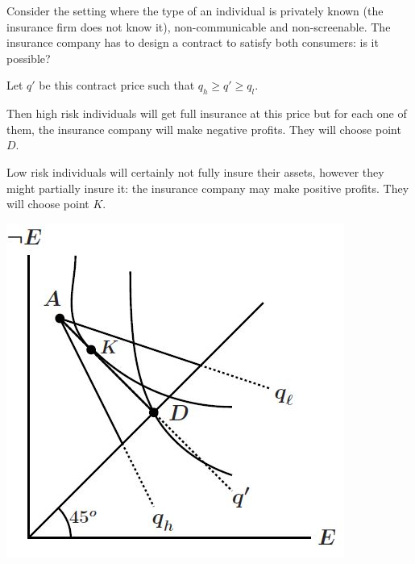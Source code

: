 \documentclass[12pt]{report}
\begin{document}
Consider the setting where the type of an individual is privately known (the insurance firm does not know it), non-communicable and non-screenable. The insurance company has to design a contract to satisfy both consumers: is it possible?

\begin{minipage}{0.69\textwidth}
Let $q'$ be this contract price such that $q_h \geq q' \geq q_l$. 

Then high risk individuals will get full insurance at this price but for each one of them, the insurance company will make negative profits. They will choose point $D$.

Low risk individuals will certainly not fully insure their assets, however they might partially insure it: the insurance company may make positive profits. They will choose point $K$.
\end{minipage}
\begin{minipage}{0.29\textwidth}
\centering
\includegraphics[scale=0.35]{images/advsel}
\end{minipage} \hfill
\end{document}
